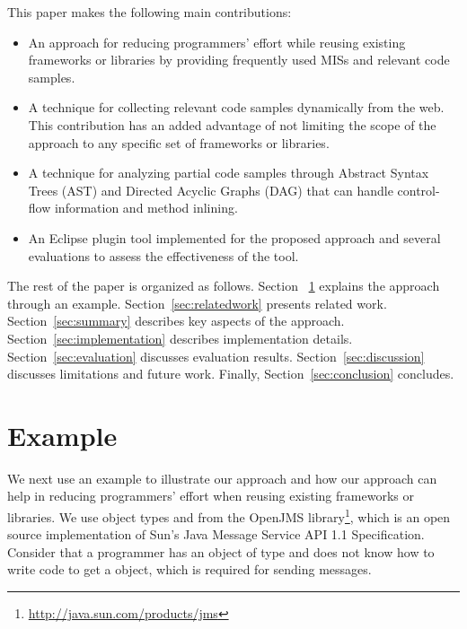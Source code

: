 \documentclass{fp035-thummalapenta}
\begin{document}
This paper makes the following main contributions:\vspace*{-1ex}
\begin{itemize}
\item An approach for reducing programmers' effort while reusing existing frameworks or libraries by providing frequently used MISs and relevant code samples.
\item A technique for collecting relevant code samples dynamically from the web. This contribution has an added advantage of not limiting the scope of the approach to any specific set of frameworks or libraries.
\item A technique for analyzing partial code samples through Abstract Syntax Trees (AST) and Directed Acyclic Graphs (DAG) that can handle control-flow information and method inlining.
\item An Eclipse plugin tool implemented for the proposed approach
and several evaluations to assess the effectiveness of the tool.
\end{itemize}

The rest of the paper is organized as follows. Section
~\ref{sec:example} explains the approach through an example.
Section~\ref{sec:relatedwork} presents related work.
Section~\ref{sec:summary} describes key aspects of the approach.
Section~\ref{sec:implementation} describes implementation details.
Section~\ref{sec:evaluation} discusses evaluation results.
Section~\ref{sec:discussion} discusses limitations and future work.
Finally, Section~\ref{sec:conclusion} concludes.\vspace*{-1ex}
\section{Example}
\label{sec:example}
We next use an example to illustrate our approach and how our
approach can help in reducing programmers' effort when reusing
existing frameworks or libraries. We use object types
 and  from the
OpenJMS library\footnote{\url{http://java.sun.com/products/jms}},
which is an open source implementation of Sun's Java Message Service
API 1.1 Specification. Consider that a
programmer has an object of type  and
does not know how to write code to get a 
object, which is required for sending messages.
\end{document}
